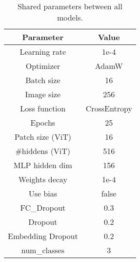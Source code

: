 \documentclass[twocolumn,superscriptaddress,aps]{revtex4-1}
\begin{document}
\begin{table}[ht]
  \centering
  \caption{Shared parameters between all models.}
  \label{tab:common-hyperparams}
  \begin{tabular}{|c|c|}
    \hline
    \textbf{Parameter}           & \textbf{Value}                                \\
    \hline
    Learning rate               & 1e-4                                           \\
    Optimizer                   & AdamW                                          \\
    Batch size                  & 16                                             \\
    Image size                  & 256                                            \\
    Loss function               & CrossEntropy                                   \\
    Epochs                      & 25                                             \\
    Patch size (ViT)            & 16                                             \\
    \#hiddens    (ViT)          & 516                                            \\
    MLP hidden dim              & 156                                            \\
    Weights decay               & 1e-4                                           \\
    Use bias                    & false                                          \\
    FC\_Dropout                 & 0.3                                            \\
    Dropout                     & 0.2                                            \\
    Embedding Dropout                     & 0.2                                            \\
    num\_classes                & 3                                              \\
    \hline
  \end{tabular}
\end{table}
\end{document}
